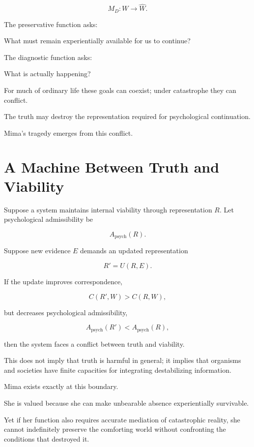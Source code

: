 \documentclass[11pt,oneside]{book}
\theoremstyle{definition}
\theoremstyle{remark}
\begin{document}
\[
M_D:
W
\rightarrow
\widehat W.
\]

The preservative function asks:

\begin{center}
What must remain experientially available for us to continue?
\end{center}

The diagnostic function asks:

\begin{center}
What is actually happening?
\end{center}

For much of ordinary life these goals can coexist; under catastrophe they can conflict.

The truth may destroy the representation required for psychological continuation.

Mima's tragedy emerges from this conflict.

\section{A Machine Between Truth and Viability}

Suppose a system maintains internal viability through representation \(R\). Let psychological admissibility be

\[
A_{\mathrm{psych}}(R).
\]

Suppose new evidence \(E\) demands an updated representation

\[
R'=U(R,E).
\]

If the update improves correspondence,

\[
C(R',W)>C(R,W),
\]

but decreases psychological admissibility,

\[
A_{\mathrm{psych}}(R')
<
A_{\mathrm{psych}}(R),
\]

then the system faces a conflict between truth and viability.

This does not imply that truth is harmful in general; it implies that organisms and societies have finite capacities for integrating destabilizing information.

Mima exists exactly at this boundary.

She is valued because she can make unbearable absence experientially survivable.

Yet if her function also requires accurate mediation of catastrophic reality, she cannot indefinitely preserve the comforting world without confronting the conditions that destroyed it.
\end{document}

